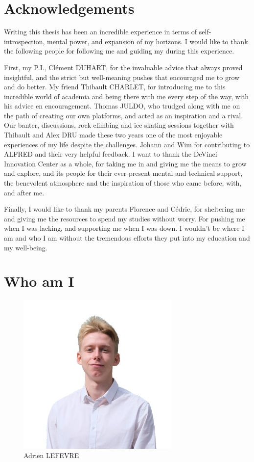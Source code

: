 \section{Acknowledgements}

Writing this thesis has been an incredible experience in terms of self-introspection, mental power, and expansion of my horizons. I would like to thank the following people for following me and guiding my during this experience.

First, my P.I., Clément DUHART, for the invaluable advice that always proved insightful, and the strict but well-meaning pushes that encouraged me to grow and do better. My friend Thibault CHARLET, for introducing me to this incredible world of academia and being there with me every step of the way, with his advice en encouragement. Thomas JULDO, who trudged along with me on the path of creating our own platforms, and acted as an inspiration and a rival. Our banter, discussions, rock climbing and ice skating sessions together with Thibault and Alex DRU made these two years one of the most enjoyable experiences of my life despite the challenges. Johann and Wim for contributing to ALFRED and their very helpful feedback. I want to thank the DeVinci Innovation Center as a whole, for taking me in and giving me the means to grow and explore, and its people for their ever-present mental and technical support, the benevolent atmosphere and the inspiration of those who came before, with, and after me.

Finally, I would like to thank my parents Florence and Cédric, for sheltering me and giving me the resources to spend my studies without worry. For pushing me when I was lacking, and supporting me when I was down. I wouldn't be where I am and who I am without the tremendous efforts they put into my education and my well-being.




\newpage


\section{Who am I}

\begin{figure}[h]
    \centering
    \includegraphics[width=8cm]{images/adrien.png}
    \caption{Adrien LEFEVRE}
\end{figure}



